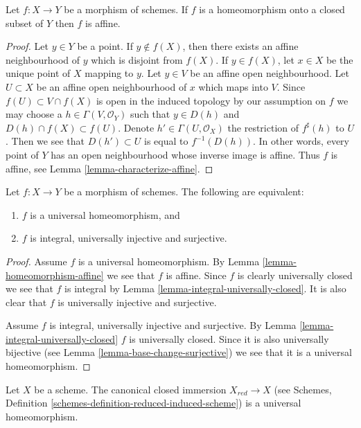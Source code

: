 \begin{lemma}
\label{lemma-homeomorphism-affine}
Let $f : X \to Y$ be a morphism of schemes. If $f$ is a homeomorphism
onto a closed subset of $Y$ then $f$ is affine.
\end{lemma}

\begin{proof}
Let $y \in Y$ be a point. If $y \not \in f(X)$, then there exists
an affine neighbourhood of $y$ which is disjoint from $f(X)$.
If $y \in f(X)$, let $x \in X$ be the unique point of $X$ mapping to $y$.
Let $y \in V$ be an affine open neighbourhood.
Let $U \subset X$ be an affine open neighbourhood of $x$ which maps into $V$.
Since $f(U) \subset V \cap f(X)$ is open in the induced topology by our
assumption on $f$ we may choose a
$h \in \Gamma(V, \mathcal{O}_Y)$ such that $y \in D(h)$
and $D(h) \cap f(X) \subset f(U)$. Denote $h' \in \Gamma(U, \mathcal{O}_X)$
the restriction of $f^\sharp(h)$ to $U$. Then we see that
$D(h') \subset U$ is equal to $f^{-1}(D(h))$. In other words, every point
of $Y$ has an open neighbourhood whose inverse image is affine.
Thus $f$ is affine, see
Lemma \ref{lemma-characterize-affine}.
\end{proof}

\begin{lemma}
\label{lemma-universal-homeomorphism}
Let $f : X \to Y$ be a morphism of schemes. The following are
equivalent:
\begin{enumerate}
\item $f$ is a universal homeomorphism, and
\item $f$ is integral, universally injective and surjective.
\end{enumerate}
\end{lemma}

\begin{proof}
Assume $f$ is a universal homeomorphism. By
Lemma \ref{lemma-homeomorphism-affine}
we see that $f$ is affine. Since $f$ is clearly universally closed we
see that $f$ is integral by
Lemma \ref{lemma-integral-universally-closed}.
It is also clear that $f$ is universally injective and surjective.

\medskip\noindent
Assume $f$ is integral, universally injective and surjective. By
Lemma \ref{lemma-integral-universally-closed}
$f$ is universally closed. Since it is also universally bijective (see
Lemma \ref{lemma-base-change-surjective})
we see that it is a universal homeomorphism.
\end{proof}

\begin{lemma}
\label{lemma-reduction-universal-homeomorphism}
Let $X$ be a scheme. The canonical closed immersion $X_{red} \to X$ (see
Schemes, Definition \ref{schemes-definition-reduced-induced-scheme})
is a universal homeomorphism.
\end{lemma}

